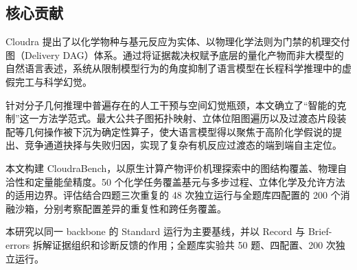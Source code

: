 \subsection{核心贡献}

Cloudra 提出了以化学物种与基元反应为实体、以物理化学法则为门禁的机理交付图（Delivery DAG）体系。通过将证据裁决权赋予底层的量化产物而非大模型的自然语言表述，系统从限制模型行为的角度抑制了语言模型在长程科学推理中的虚假完工与科学幻觉。

针对分子几何推理中普遍存在的人工干预与空间幻觉瓶颈，本文确立了“智能的克制”这一方法学范式。最大公共子图拓扑映射、立体位阻图遍历以及过渡态片段装配等几何操作被下沉为确定性算子，使大语言模型得以聚焦于高阶化学假说的提出、竞争通道抉择与失败归因，实现了复杂有机反应过渡态的端到端自主定位。

本文构建 CloudraBench，以原生计算产物评价机理探索中的图结构覆盖、物理自洽性和定量能垒精度。50 个化学任务覆盖基元与多步过程、立体化学及允许方法的适用边界。评估结合四题三次重复的 48 次独立运行与全题库四配置的 200 个消融沙箱，分别考察配置差异的重复性和跨任务覆盖。

本研究以同一 backbone 的 Standard 运行为主要基线，并以 Record 与 Brief-errors 拆解证据组织和诊断反馈的作用；全题库实验共 50 题、四配置、200 次独立运行。
